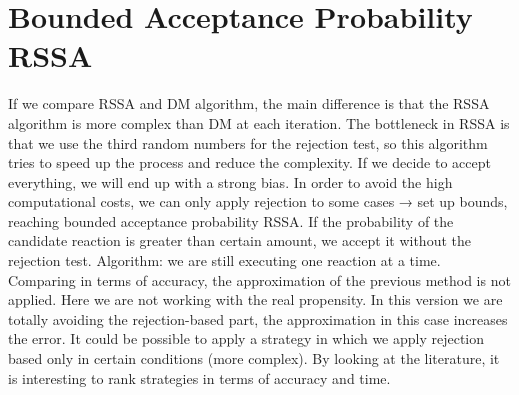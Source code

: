 \section{Bounded Acceptance Probability RSSA}
If we compare RSSA and DM algorithm, the main difference is that the RSSA algorithm is more complex than DM at each iteration.
The bottleneck in RSSA is that we use the third random numbers for the rejection test, so this algorithm tries to speed up the process and reduce the complexity.
If we decide to accept everything, we will end up with a strong bias.
In order to avoid the high computational costs, we can only apply rejection to some cases → set up bounds, reaching bounded acceptance probability RSSA.
If the probability of the candidate reaction is greater than certain amount, we accept it without the rejection test.
Algorithm: we are still executing one reaction at a time.
Comparing in terms of accuracy, the approximation of the previous method is not applied.
Here we are not working with the real propensity.
In this version we are totally avoiding the rejection-based part, the approximation in this case increases the error.
It could be possible to apply a strategy in which we apply rejection based only in certain conditions (more complex).
By looking at the literature, it is interesting to rank strategies in terms of accuracy and time.

